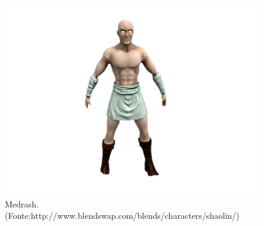 \begin{figure}[!ht]
 \centering
 \includegraphics[scale=1]{Imagens/medrash01.png}
 \caption{Medrash.(Fonte:http://www.blendswap.com/blends/characters/shaolin/)}
\label{img:medrash}
\end{figure}

